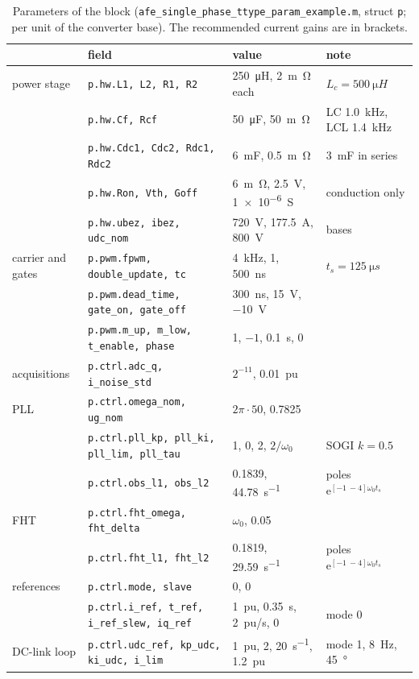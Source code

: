 \documentclass[10pt,a4paper]{scrartcl}
\newcommand{\ts}{t_s}
\newcommand{\wo}{\omega_0}
\newcommand{\ee}{\mathrm{e}}
\newcommand{\code}[1]{\texttt{#1}}
\begin{document}
\begin{onehalfspace}
\begin{table}[htb]
\centering\footnotesize\setlength{\tabcolsep}{3pt}
\caption{Parameters of the block (\code{afe\_single\_phase\_ttype\_param\_example.m}, struct \code{p}; per unit of the converter base). The recommended current gains are in brackets.}
\label{tab:param}
\begin{tabular}{@{}llll@{}}
\toprule
 & field & value & note \\
\midrule
power stage & \code{p.hw.L1, L2, R1, R2} & \SI{250}{\micro H}, \SI{2}{m\ohm} each & $L_c = \SI{500}{\micro H}$ \\
 & \code{p.hw.Cf, Rcf} & \SI{50}{\micro F}, \SI{50}{m\ohm} & LC \SI{1.0}{kHz}, LCL \SI{1.4}{kHz} \\
 & \code{p.hw.Cdc1, Cdc2, Rdc1, Rdc2} & \SI{6}{mF}, \SI{0.5}{m\ohm} & \SI{3}{mF} in series \\
 & \code{p.hw.Ron, Vth, Goff} & \SI{6}{m\ohm}, \SI{2.5}{V}, \SI{1e-6}{S} & conduction only \\
 & \code{p.hw.ubez, ibez, udc\_nom} & \SI{720}{V}, \SI{177.5}{A}, \SI{800}{V} & bases \\
carrier and gates & \code{p.pwm.fpwm, double\_update, tc} & \SI{4}{kHz}, 1, \SI{500}{ns} & $\ts = \SI{125}{\micro s}$ \\
 & \code{p.pwm.dead\_time, gate\_on, gate\_off} & \SI{300}{ns}, \SI{15}{V}, \SI{-10}{V} & \\
 & \code{p.pwm.m\_up, m\_low, t\_enable, phase} & 1, $-1$, \SI{0.1}{s}, 0 & \\
acquisitions & \code{p.ctrl.adc\_q, i\_noise\_std} & $2^{-11}$, \SI{0.01}{pu} & \\
PLL & \code{p.ctrl.omega\_nom, ug\_nom} & $2\pi\cdot50$, 0.7825 & \\
 & \code{p.ctrl.pll\_kp, pll\_ki, pll\_lim, pll\_tau} & 1, 0, 2, $2/\wo$ & SOGI $k = 0.5$ \\
 & \code{p.ctrl.obs\_l1, obs\_l2} & 0.1839, \SI{44.78}{s^{-1}} & poles $\ee^{[-1\ -4]\wo\ts}$ \\
FHT & \code{p.ctrl.fht\_omega, fht\_delta} & $\wo$, 0.05 & \\
 & \code{p.ctrl.fht\_l1, fht\_l2} & 0.1819, \SI{29.59}{s^{-1}} & poles $\ee^{[-1\ -4]\wo\ts}$ \\
references & \code{p.ctrl.mode, slave} & 0, 0 & \\
 & \code{p.ctrl.i\_ref, t\_ref, i\_ref\_slew, iq\_ref} & \SI{1}{pu}, \SI{0.35}{s}, \SI{2}{pu/s}, 0 & mode 0 \\
DC-link loop & \code{p.ctrl.udc\_ref, kp\_udc, ki\_udc, i\_lim} & \SI{1}{pu}, 2, \SI{20}{s^{-1}}, \SI{1.2}{pu} & mode 1, \SI{8}{Hz}, \SI{45}{\degree} \\

\end{tabular}
\end{table}
\end{onehalfspace}
\end{document}
